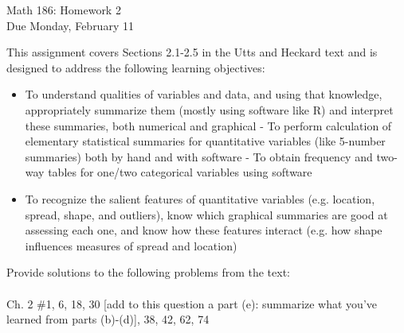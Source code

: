 \documentclass{article}
\begin{document}
\begin{center}
  \Large Math 186: Homework 2\\
  \Large Due Monday, February 11
  \end{center}

This assignment covers Sections 2.1-2.5 in the Utts and Heckard text and is designed to address the following learning objectives:\\

\begin{itemize}
\item To understand qualities of variables and data, and using that knowledge, appropriately summarize them (mostly using software like R) and interpret these summaries, both numerical and graphical
\subitem - To perform calculation of elementary statistical summaries for quantitative variables (like 5-number summaries) both by hand and with software
\subitem - To obtain frequency and two-way tables for one/two categorical variables using software
\item To recognize the salient features of quantitative variables (e.g. location, spread, shape, and outliers), know which graphical summaries are good at assessing each one, and know how these features interact (e.g. how shape influences measures of spread and location)
\end{itemize}

\hrulefill
\vspace{.2in}

\noindent
Provide solutions to the following problems from the text:\\ \\
Ch. 2 \#1, 6, 18, 30 [add to this question a part (e): summarize what you've learned from parts (b)-(d)], 38, 42, 62, 74
\end{document}
